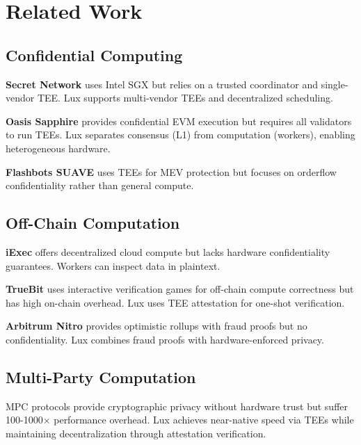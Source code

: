 \section{Related Work}


\subsection{Confidential Computing}

\textbf{Secret Network} \cite{secret-network} uses Intel SGX but relies on a trusted coordinator and single-vendor TEE. Lux supports multi-vendor TEEs and decentralized scheduling.

\textbf{Oasis Sapphire} \cite{oasis-sapphire} provides confidential EVM execution but requires all validators to run TEEs. Lux separates consensus (L1) from computation (workers), enabling heterogeneous hardware.

\textbf{Flashbots SUAVE} \cite{flashbots-suave} uses TEEs for MEV protection but focuses on orderflow confidentiality rather than general compute.

\subsection{Off-Chain Computation}

\textbf{iExec} \cite{iexec} offers decentralized cloud compute but lacks hardware confidentiality guarantees. Workers can inspect data in plaintext.

\textbf{TrueBit} \cite{truebit} uses interactive verification games for off-chain compute correctness but has high on-chain overhead. Lux uses TEE attestation for one-shot verification.

\textbf{Arbitrum Nitro} \cite{arbitrum} provides optimistic rollups with fraud proofs but no confidentiality. Lux combines fraud proofs with hardware-enforced privacy.

\subsection{Multi-Party Computation}

MPC protocols \cite{mpc-overview} provide cryptographic privacy without hardware trust but suffer 100-1000$\times$ performance overhead. Lux achieves near-native speed via TEEs while maintaining decentralization through attestation verification.

